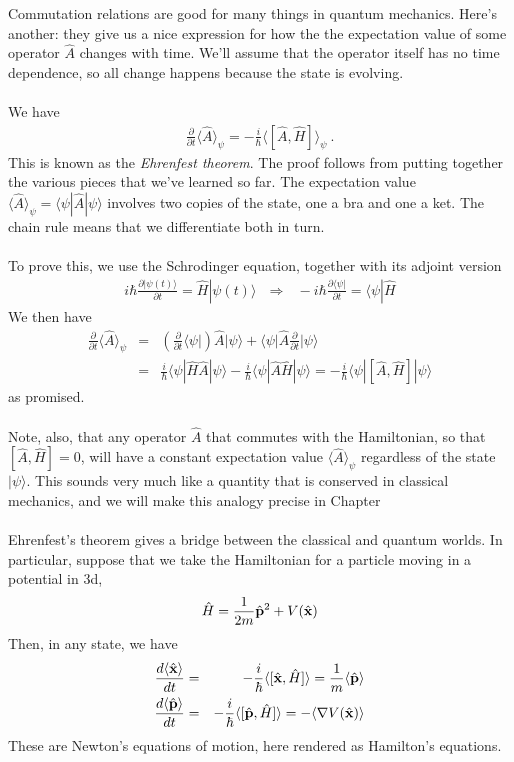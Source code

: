\documentclass[12pt]{article}
\def\be{\begin{eqnarray}}
\def\ee{\end{eqnarray}}
\newcommand{\nn}{\nonumber}
\newcommand\para{\paragraph{}}
\newcommand{\ppp}[2]{\frac{\partial {#1}}{\partial {#2}}}
\newcommand{\ket}[1]{|#1\rangle}
\newcommand{\bra}[1]{\langle#1|}
\newcommand{\co}{\color{olive}}
\newcommand{\bx}{{\bf x}}
\newcommand{\bp}{{\bf p}}
\begin{document}
{Commutation relations are good for many things in quantum mechanics. Here's another: they give us a nice expression for how the the expectation value of some operator $\hat{A}$ changes with time. 
We'll assume that the operator itself has no time dependence, so all change happens because the state is evolving. 

\para
{\co We have
%
\be \ppp{}{t}\langle \hat{A}\rangle_\psi = -\frac{i}{\hbar}\langle[\hat{A},\hat{H}]\rangle_\psi\ .\nn\ee
%
This is known as the {\it Ehrenfest theorem}.} The proof follows from putting together the various pieces that we've learned so far. The expectation value $\langle\hat{A}\rangle_\psi = \bra{\psi}\hat{A}\ket{\psi}$ involves two copies of the state, one a bra and one a ket. The chain rule means that we differentiate both in turn. 

\para
{\co To prove this, we use the Schrodinger equation, together with its adjoint version
%
\be i\hbar\ppp{\ket{\psi(t)}}{t} = \hat{H}\ket{\psi(t)}\ \ \ \Longrightarrow\ \ \ -i\hbar\ppp{\bra{\psi}}{t} =\bra{\psi}\hat{H}\nn\ee
%
We then have
%
\be \ppp{}{t}\langle \hat{A}\rangle_\psi&=& \left(\ppp{}{t}\bra{\psi}\right)\hat{A}\ket{\psi} + \bra{\psi}\hat{A}\ppp{}{t}\ket{\psi} \nn\\
&=&\frac{i}{\hbar}\bra{\psi}\hat{H}\hat{A}\ket{\psi} - \frac{i}{\hbar}\bra{\psi}\hat{A}\hat{H}\ket{\psi}=-\frac{i}{\hbar}\bra{\psi}[\hat{A},\hat{H}]\ket{\psi}\nn\ee
%
as promised.}

\para
Note, also, that any operator $\hat{A}$ that commutes with the Hamiltonian, so that $[\hat{A},\hat{H}]=0$, will have a constant expectation value $\langle \hat{A}\rangle_\psi$ regardless of the state $\ket{\psi}$. This sounds very much like a quantity that is conserved in classical mechanics, and we will make this analogy precise in Chapter 


\para
{\co 
Ehrenfest's theorem gives a bridge between the classical and quantum worlds. In particular, suppose that we take the Hamiltonian for a particle moving in a potential in 3d,
%
\be \hat{H} = \frac{1}{2m}\hat{\bp}^2 + V(\hat{\bx})\nn\ee
%
Then, in any state, we have
%
\be \frac{d\langle \hat{\bx}\rangle}{dt} &=& -\frac{i}{\hbar} \langle [\hat{\bx},\hat{H}]\rangle = \frac{1}{m}\langle \hat{\bp}\rangle\nn\\ \frac{d\langle \hat{\bp}\rangle}{dt} &=& -\frac{i}{\hbar} \langle [\hat{\bp},\hat{H}]\rangle =  - \langle \nabla V (\hat{\bx})\rangle
\nn\ee
%
These are Newton's equations of motion, here rendered as Hamilton's equations. }



}
\end{document}
